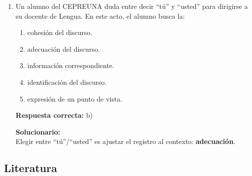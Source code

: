 \begin{enumerate}
\textbf{Respuesta correcta:} c)

\vspace{2mm}
\textbf{Solucionario:}\\
Usa terminología científica (\textbf{átomos}, \textbf{moléculas}), por eso es \textbf{técnico}.

\item  Un alumno del CEPREUNA duda entre decir ``tú'' y ``usted'' para dirigirse a su docente de Lengua. En este acto, el alumno busca la:
\begin{enumerate}[label=\alph*)]
	\item cohesión del discurso.
	\item adecuación del discurso.
	\item información correspondiente.
	\item identificación del discurso.
	\item expresión de un punto de vista.
\end{enumerate}

\textbf{Respuesta correcta:} b)

\vspace{2mm}
\textbf{Solucionario:}\\
Elegir entre ``tú''/``usted'' es ajustar el registro al contexto: \textbf{adecuación}.

\end{enumerate}



\subsection*{Literatura}

